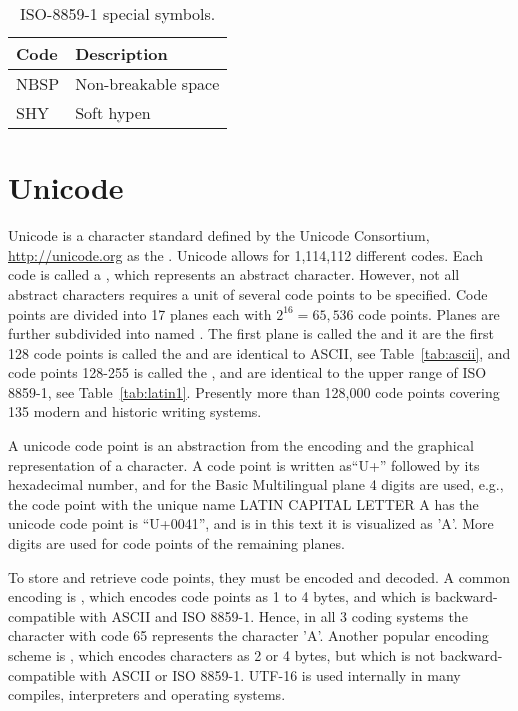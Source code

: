 \begin{table}
  \centering
  \begin{tabular}{|l|l|}
    \hline
    Code & Description\\
    \hline
    NBSP & Non-breakable space\\
    SHY & Soft hypen\\
    \hline
  \end{tabular}
  \caption{ISO-8859-1 special symbols.}
  \label{tab:latin1SpecialSymbols}
\end{table}

\section{Unicode}
Unicode is a character standard defined by the Unicode Consortium, \url{http://unicode.org} as the . Unicode allows for 1,114,112 different codes. Each code is called a , which represents an abstract character. However, not all abstract characters requires a unit of several code points to be specified. Code points are divided into 17 planes each with $2^{16}=65,536$ code points. Planes are further subdivided into named . The first plane is called the  and it are the first 128 code points is called the  and are identical to ASCII, see Table~\ref{tab:ascii}, and code points 128-255 is called the , and are identical to the upper range of ISO 8859-1, see Table~\ref{tab:latin1}.  Presently more than 128,000 code points covering 135 modern and historic writing systems.

A unicode code point is an abstraction from the encoding and the graphical representation of a character. A code point is written as``U+'' followed by its hexadecimal number, and for the Basic Multilingual plane 4 digits are used, e.g., the code point with the unique name LATIN CAPITAL LETTER A has the unicode code point is ``U+0041'', and is in this text it is visualized as 'A'. More digits are used for code points of the remaining planes.

To store and retrieve code points, they must be encoded and decoded. A common encoding is , which encodes code points as 1 to 4 bytes, and which is backward-compatible with ASCII and ISO 8859-1. Hence, in all 3 coding systems the character with code 65 represents the character 'A'. Another popular encoding scheme is , which encodes characters as 2 or 4 bytes, but which is not backward-compatible with ASCII or ISO 8859-1. UTF-16 is used internally in many compiles, interpreters and operating systems.

